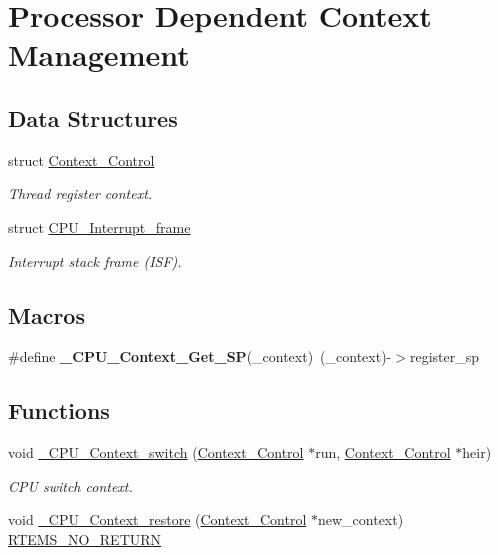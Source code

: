 \hypertarget{group__RTEMSScoreCPUBfinCPUContext}{}\section{Processor Dependent Context Management}
\label{group__RTEMSScoreCPUBfinCPUContext}
\subsection*{Data Structures}
\begin{DoxyCompactItemize}
\item 
struct \mbox{\hyperlink{structContext__Control}{Context\+\_\+\+Control}}
\begin{DoxyCompactList}\small\item\em Thread register context. \end{DoxyCompactList}\item 
struct \mbox{\hyperlink{structCPU__Interrupt__frame}{C\+P\+U\+\_\+\+Interrupt\+\_\+frame}}
\begin{DoxyCompactList}\small\item\em Interrupt stack frame (I\+SF). \end{DoxyCompactList}\end{DoxyCompactItemize}
\subsection*{Macros}
\begin{DoxyCompactItemize}
\item 
\mbox{\label{group__RTEMSScoreCPUBfinCPUContext_ga896055157b72692a6141f7c0039eabdf}} 
\#define {\bfseries \+\_\+\+C\+P\+U\+\_\+\+Context\+\_\+\+Get\+\_\+\+SP}(\+\_\+context)~(\+\_\+context)-\/$>$register\+\_\+sp
\end{DoxyCompactItemize}
\subsection*{Functions}
\begin{DoxyCompactItemize}
\item 
void \mbox{\hyperlink{group__RTEMSScoreCPUBfinCPUContext_gaa9f8cc989454b28232e5375e30c90970}{\+\_\+\+C\+P\+U\+\_\+\+Context\+\_\+switch}} (\mbox{\hyperlink{structContext__Control}{Context\+\_\+\+Control}} $\ast$run, \mbox{\hyperlink{structContext__Control}{Context\+\_\+\+Control}} $\ast$heir)
\begin{DoxyCompactList}\small\item\em C\+PU switch context. \end{DoxyCompactList}\item 
void \mbox{\hyperlink{group__RTEMSScoreCPUBfinCPUContext_ga80726ebfe00f31a88b086cc4474c472f}{\+\_\+\+C\+P\+U\+\_\+\+Context\+\_\+restore}} (\mbox{\hyperlink{structContext__Control}{Context\+\_\+\+Control}} $\ast$new\+\_\+context) \mbox{\hyperlink{group__RTEMSScoreBaseDefs_gaa2f0ed67aa174f684bb31b7e8bdb386f}{R\+T\+E\+M\+S\+\_\+\+N\+O\+\_\+\+R\+E\+T\+U\+RN}}
\end{DoxyCompactItemize}


